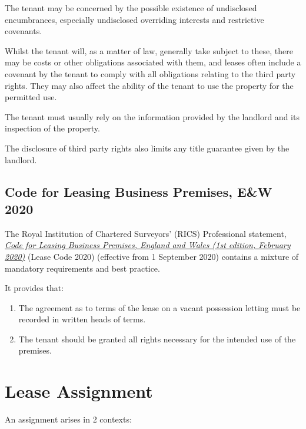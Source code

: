 \documentclass[
]{article}
\providecommand{\tightlist}{%
  \setlength{\itemsep}{0pt}\setlength{\parskip}{0pt}}
\begin{document}
The tenant may be concerned by the possible existence of undisclosed
encumbrances, especially undisclosed overriding interests and
restrictive covenants.

Whilst the tenant will, as a matter of law, generally take subject to
these, there may be costs or other obligations associated with them, and
leases often include a covenant by the tenant to comply with all
obligations relating to the third party rights. They may also affect the
ability of the tenant to use the property for the permitted use.

The tenant must usually rely on the information provided by the landlord
and its inspection of the property.

The disclosure of third party rights also limits any title guarantee
given by the landlord.

\hypertarget{code-for-leasing-business-premises-ew-2020}{%
\subsection{Code for Leasing Business Premises, E\&W
2020}\label{code-for-leasing-business-premises-ew-2020}}

The Royal Institution of Chartered Surveyors' (RICS) Professional
statement,
\emph{\href{https://www.rics.org/globalassets/code-for-leasing_ps-version_feb-2020.pdf}{Code
for Leasing Business Premises, England and Wales (1st edition, February
2020)}} (Lease Code 2020) (effective from 1 September 2020) contains a
mixture of mandatory requirements and best practice.

It provides that:

\begin{enumerate}
\def\labelenumi{\arabic{enumi}.}
\tightlist
\item
  The agreement as to terms of the lease on a vacant possession letting
  must be recorded in written heads of terms.
\item
  The tenant should be granted all rights necessary for the intended use
  of the premises.
\end{enumerate}

\hypertarget{lease-assignment}{%
\section{Lease Assignment}\label{lease-assignment}}

An assignment arises in 2 contexts:
\end{document}
